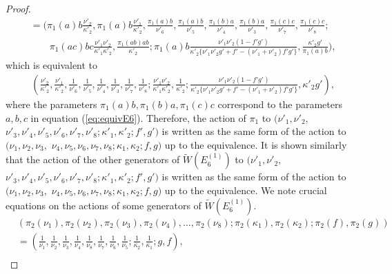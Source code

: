 \documentclass[12pt]{amsart}
\numberwithin{equation}{section}
\theoremstyle{definition}
\begin{document}
\begin{proof}
\begin{align}
& = ( \pi _1 ( a ) b \frac{ \nu '_2 }{ \kappa ' _2} , \pi _1 ( a ) b \frac{ \nu '_1 }{\kappa ' _2} ,  \frac{ \pi _1 ( a ) b  }{ \nu '_6 }  , \frac{ \pi _1 ( a ) b  }{ \nu '_5 } , \frac{  \pi _1 ( b ) a }{ \nu '_4 } , \frac{ \pi _1 ( b ) a }{ \nu '_3} , \frac{ \pi _1 (c ) c }{ \nu '_7} , \frac{ \pi _1 ( c ) c }{ \nu '_8} ; \nonumber \\
& \qquad \pi _1 ( a c) b c  \frac{  \nu '_1 \nu '_2 }{ \kappa '_1\kappa '_2}  , \frac{ \pi _1 ( ab ) ab }{\kappa '_2 }  ; \pi _1 ( a ) b  \frac{\nu '_1 \nu '_2 ( 1- f'g' )}{ \kappa ' _2 \{ \nu '_1 \nu'_2 g' + f' - (\nu '_1 + \nu '_2 ) f' g' \} } , \frac{\kappa '_2 g' }{\pi _1 ( a ) b }  ) , \nonumber 
\end{align} 
which is equivalent to
\begin{align}
& ( \frac{ \nu '_2 }{ \kappa ' _2} , \frac{ \nu '_1 }{\kappa ' _2} ,  \frac{1 }{ \nu '_6 }  , \frac{ 1 }{ \nu '_5 } , \frac{1 }{ \nu '_4 } , \frac{ 1}{ \nu '_3} , \frac{ 1 }{ \nu '_7} , \frac{ 1 }{ \nu '_8} ;  \frac{  \nu '_1 \nu '_2 }{ \kappa '_1\kappa '_2}  , \frac{ 1 }{\kappa '_2 }  ;   \frac{\nu '_1 \nu '_2 ( 1- f'g' )}{ \kappa ' _2 \{ \nu '_1 \nu'_2 g' + f' - (\nu '_1 + \nu '_2 ) f' g' \} } , \kappa '_2 g'  ) ,
\end{align} 
where the parameters $\pi _1 ( a ) b  ,  \pi _1 ( b ) a ,  \pi _1 ( c ) c$ correspond to the parameters $a,b,c $ in equation (\ref{eq:equivE6}).
Therefore, the action of $\pi _1 $ to $(\nu '_1 , \nu '_2 ,$ $ \nu '_3 , \nu '_4 ,\nu '_5 ,\nu '_6 , \nu '_7 ,\nu '_8 ; \kappa '_1 ,\kappa '_2 ; f' ,g' ) $ is written as the same form of the action to $(\nu _1 , \nu _2 , \nu _3 ,$ $ \nu _4 ,\nu _5 ,\nu _6 , \nu _7 ,\nu _8 ; \kappa _1 ,\kappa _2 ; f ,g ) $ up to the equivalence.
It is shown similarly that the action of the other generators of $\widetilde{W}(E^{(1)}_{6})$ to $(\nu '_1 , \nu '_2 ,$ $ \nu '_3 , \nu '_4 ,\nu '_5 ,\nu '_6 , \nu '_7 ,\nu '_8 ; \kappa '_1 ,\kappa '_2 ; f' ,g' ) $ is written as the same form of the action to $(\nu _1 , \nu _2 , \nu _3 ,$ $ \nu _4 ,\nu _5 ,\nu _6 , \nu _7 ,\nu _8 ; \kappa _1 ,\kappa _2 ; f ,g ) $ up to the equivalence.
We note crucial equations on the actions of some generators of $\widetilde{W}(E^{(1)}_{6})$.
\begin{align}
& (\pi _2 ( \nu _1) , \pi _2 (\nu _2) , \pi _2 ( \nu _3) , \pi _2 ( \nu _4) , \dots , \pi _2 (\nu _8) ;  \pi _2 (\kappa _1) , \pi _2 (\kappa _2) ;  \pi _2 (f ) , \pi _2 (g) ) \\
& = (\frac{1}{\nu_1}, \frac{1}{\nu_2}, \frac{1}{\nu_3}, \frac{1}{\nu_4}, \frac{1}{\nu_8} , \frac{1}{\nu_7}, \frac{1}{\nu_6}, \frac{1}{\nu_5} ; \frac{1}{\kappa_2} , \frac{1}{\kappa_1}  ; g , f ),  \nonumber \\

\end{align}
\end{proof}
\end{document}
